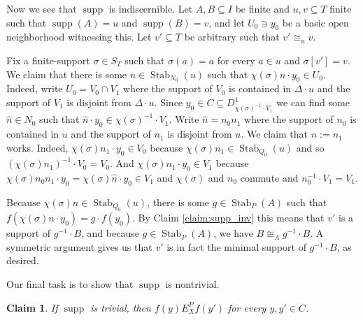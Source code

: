 \documentclass[12pt]{amsart}
\theoremstyle{plain}
\newtheorem{claim}{Claim}
\theoremstyle{definition}
\newcommand{\isom}{\cong}
\DeclareMathOperator{\supp}{supp}
\DeclareMathOperator{\Stab}{Stab}
\begin{document}
Now we see that $\supp$ is indiscernible.
Let $A, B \subseteq I$ be finite and $u, v \subseteq T$ finite such that $\supp(A) = u$ and $\supp(B) = v$, and let $U_0 \ni y_0$ be a basic open neighborhood witnessing this.
Let $v' \subseteq T$ be arbitrary such that $v' \isom_u v$.

Fix a finite-support $\sigma \in S_T$ such that $\sigma(a) = a$ for every $a \in u$ and $\sigma[v'] = v$.
We claim that there is some $n \in \Stab_{N_0}(u)$ such that $\chi(\sigma) n \cdot y_0 \in U_0$.
Indeed, write $U_0 = V_0 \cap V_1$ where the support of $V_0$ is contained in $\Delta \cdot u$ and the support of $V_1$ is disjoint from $\Delta \cdot u$.
Since $y_0 \in C \subseteq D^1_{\chi(\sigma)^{-1} \cdot V_1}$ we can find some $\hat{n} \in N_0$ such that $\hat{n} \cdot y_0 \in \chi(\sigma)^{-1} \cdot V_1$.
Write $\hat{n} = n_0 n_1$ where the support of $n_0$ is contained in $u$ and the support of $n_1$ is disjoint from $u$.
We claim that $n := n_1$ works.
Indeed, $\chi(\sigma) n_1 \cdot y_0 \in V_0$ because $\chi(\sigma) n_1 \in \Stab_{Q_0}(u)$ and so $(\chi(\sigma)n_1)^{-1} \cdot V_0 = V_0$.
And $\chi(\sigma)n_1 \cdot y_0 \in V_1$ because $\chi(\sigma)n_0n_1 \cdot y_0 =\chi(\sigma) \hat{n} \cdot y_0 \in V_1$ and $\chi(\sigma)$ and $n_0$ commute and $n_0^{-1} \cdot V_1 = V_1$.

Because $\chi(\sigma)n \in \Stab_{Q_0}(u)$, there is some $g \in \Stab_P(A)$ such that $f(\chi(\sigma)n \cdot y_0) = g \cdot f(y_0)$.
By Claim \ref{claim:supp_inv} this means that $v'$ is a support of $g^{-1} \cdot B$, and because $g \in \Stab_P(A)$, we have $B \isom_A g^{-1} \cdot B$.
A symmetric argument gives us that $v'$ is in fact the minimal support of $g^{-1} \cdot B$, as desired.

Our final task is to show that $\supp$ is nontrivial.
\begin{claim}
If $\supp$ is trivial, then $f(y) \mathrel{E^P_X} f(y')$ for every $y, y' \in C$.
\end{claim}
\end{document}
